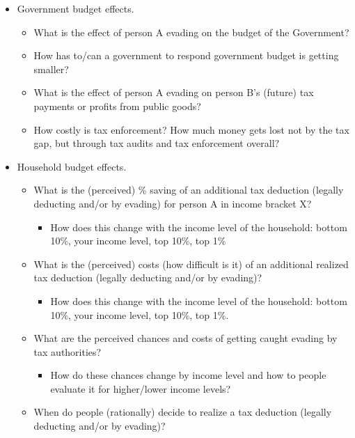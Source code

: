 \documentclass[a4paper, 12pt]{article}
\begin{document}
\begin{itemize}
    \item Government budget effects.
    \begin{itemize}
        \item What is the effect of person A evading on the budget of the Government? 
        \item How has to/can a government to respond government budget is getting smaller?
        \item What is the effect of person A evading on person B's (future) tax payments or profits from public goods?
        \item How costly is tax enforcement? How much money gets lost not by the tax gap, but through tax audits and tax enforcement overall? 
    \end{itemize}
    \item Household budget effects. 
    \begin{itemize}
        \item What is the (perceived) \% saving of an additional tax deduction (legally deducting and/or by evading) for person A in income bracket X?
        \begin{itemize}
            \item How does this change with the income level of the household: bottom 10\%, your income level, top 10\%, top 1\% 
        \end{itemize}
        \item What is the (perceived) costs (how difficult is it) of an additional realized tax deduction (legally deducting and/or by evading)?
        \begin{itemize}
            \item How does this change with the income level of the household: bottom 10\%, your income level, top 10\%, top 1\%.
        \end{itemize}
        \item What are the perceived chances and costs of getting caught evading by tax authorities?
        \begin{itemize}
            \item How do these chances change by income level and how to people evaluate it for higher/lower income levels?
        \end{itemize}
        \item When do people (rationally) decide to realize a tax deduction (legally deducting and/or by evading)?
        \begin{itemize}

\end{itemize}
\end{itemize}
\end{itemize}
\end{document}
